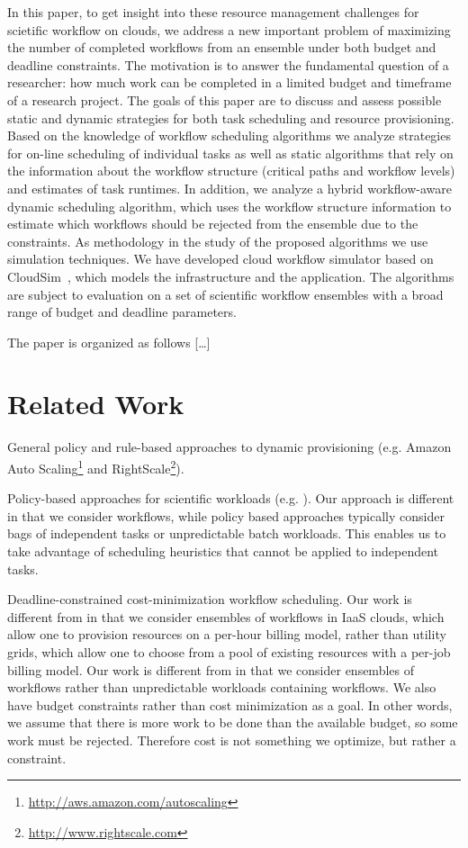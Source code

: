 \documentclass{sig-alternate}
\begin{document}
In this paper, to get insight into these resource management challenges for
scietific workflow on clouds, we address a new important problem of maximizing
the number of completed workflows from an ensemble under both budget and
deadline constraints. The motivation is to answer the fundamental question of a
researcher: how much work can be completed in a limited budget and timeframe of
a research project. The goals of this paper are to discuss and assess possible
static and dynamic strategies for both task scheduling and resource
provisioning. Based on the knowledge of workflow scheduling algorithms we
analyze strategies for on-line scheduling of individual tasks as well as static
algorithms that rely on the information about the workflow structure (critical
paths and workflow levels) and estimates of task runtimes. In addition, we
analyze a hybrid workflow-aware dynamic scheduling algorithm, which uses the
workflow structure information to estimate which workflows should be rejected
from the ensemble due to the constraints. As methodology in the study of the
proposed algorithms we use simulation techniques. We have developed cloud workflow simulator based on
CloudSim~\cite{Calheiros11}, which models the infrastructure and the application. The
algorithms are subject to evaluation on a set of scientific workflow ensembles with a broad range of
budget and deadline parameters. 

The paper is organized as follows [\ldots]

\section{Related Work}
General policy and rule-based approaches to dynamic provisioning (e.g. Amazon
Auto Scaling\footnote{\url{http://aws.amazon.com/autoscaling}} and
RightScale\footnote{\url{http://www.rightscale.com}}).

Policy-based approaches for scientific workloads (e.g. \cite{Marshall2010, Kim2011}). Our approach is different in that we consider workflows, while policy based approaches typically consider bags of independent tasks or unpredictable batch workloads. This enables us to take advantage of scheduling heuristics that cannot be applied to independent tasks.

Deadline-constrained cost-minimization workflow scheduling. Our work is different from \cite{Yu2005, Abrishami2010} in that we consider ensembles of workflows in IaaS clouds, which allow one to provision resources on a per-hour billing model, rather than utility grids, which allow one to choose from a pool of existing resources with a per-job billing model. Our work is different from \cite{Mao2011} in that we consider ensembles of workflows rather than unpredictable workloads containing workflows. We also have budget constraints rather than cost minimization as a goal. In other words, we assume that there is more work to be done than the available budget, so some work must be rejected. Therefore cost is not something we optimize, but rather a constraint.
\end{document}

